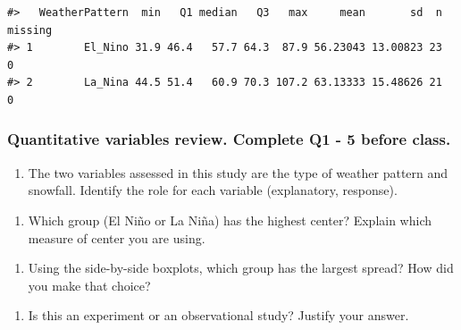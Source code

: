 \documentclass[
]{report}
\providecommand{\tightlist}{%
  \setlength{\itemsep}{0pt}\setlength{\parskip}{0pt}}
\newcommand\latexcode[1]{#1}
\begin{document}
\begin{verbatim}
#>   WeatherPattern  min   Q1 median   Q3   max     mean       sd  n missing
#> 1        El_Nino 31.9 46.4   57.7 64.3  87.9 56.23043 13.00823 23       0
#> 2        La_Nina 44.5 51.4   60.9 70.3 107.2 63.13333 15.48626 21       0
\end{verbatim}

\hypertarget{quantitative-variables-review.-complete-q1---5-before-class.}{%
\subsubsection*{Quantitative variables review. Complete Q1 - 5 before class.}\label{quantitative-variables-review.-complete-q1---5-before-class.}}

\begin{enumerate}
\def\labelenumi{\arabic{enumi}.}
\tightlist
\item
  The two variables assessed in this study are the type of weather pattern and snowfall. Identify the role for each variable (explanatory, response).
\end{enumerate}

\vspace{.6in}

\begin{enumerate}
\def\labelenumi{\arabic{enumi}.}
\setcounter{enumi}{1}
\tightlist
\item
  Which group (El Ni\latexcode{\~{n}}o or La Ni\latexcode{\~{n}}a) has the highest center? Explain which measure of center you are using.
\end{enumerate}

\vspace{.6in}

\begin{enumerate}
\def\labelenumi{\arabic{enumi}.}
\setcounter{enumi}{2}
\tightlist
\item
  Using the side-by-side boxplots, which group has the largest spread? How did you make that choice?
\end{enumerate}

\vspace{.6in}

\newpage

\begin{enumerate}
\def\labelenumi{\arabic{enumi}.}
\setcounter{enumi}{3}
\tightlist
\item
  Is this an experiment or an observational study? Justify your answer.
\end{enumerate}
\end{document}
